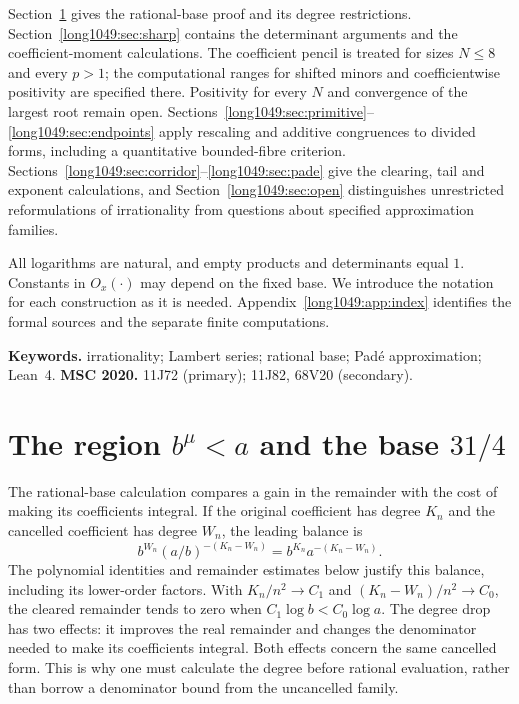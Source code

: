 \documentclass[11pt]{article}
\begin{document}
Section~\ref{long1049:sec:region} gives the rational-base proof and
its degree restrictions. Section~\ref{long1049:sec:sharp} contains
the determinant arguments and the coefficient-moment calculations.
The coefficient pencil is treated for sizes $N\le8$ and every
$p>1$; the computational ranges for shifted minors and coefficientwise
positivity are specified there. Positivity for every $N$ and
convergence of the largest root remain open.
Sections~\ref{long1049:sec:primitive}--\ref{long1049:sec:endpoints}
apply rescaling and additive congruences to divided forms, including
a quantitative bounded-fibre criterion.
Sections~\ref{long1049:sec:corridor}--\ref{long1049:sec:pade} give
the clearing, tail and exponent calculations, and
Section~\ref{long1049:sec:open} distinguishes unrestricted
reformulations of irrationality from questions about specified
approximation families.

All logarithms are natural, and empty products and determinants
equal $1$. Constants in $O_x(\cdot)$ may depend on the fixed base.
We introduce the notation for each construction as it is needed.
Appendix~\ref{long1049:app:index} identifies the formal sources and
the separate finite computations.

\medskip
\noindent\textbf{Keywords.} irrationality; Lambert series; rational base;
Pad\'e approximation; Lean~4.
\qquad
\textbf{MSC 2020.} 11J72 (primary); 11J82, 68V20 (secondary).

\section{The region \texorpdfstring{$b^{\mu}<a$}{b\textasciicircum mu < a} and the base \texorpdfstring{$31/4$}{31/4}}\label{long1049:sec:region}

The rational-base calculation compares a gain in the remainder
with the cost of making its coefficients integral. If the original
coefficient has degree $K_n$ and the cancelled coefficient has
degree $W_n$, the leading balance is
\begin{equation}\label{long1049:eq:degree-balance}
 b^{W_n}(a/b)^{-(K_n-W_n)}
 =b^{K_n}a^{-(K_n-W_n)}.
\end{equation}
The polynomial identities and remainder estimates below justify
this balance, including its lower-order factors. With
$K_n/n^2\to C_1$ and $(K_n-W_n)/n^2\to C_0$, the cleared
remainder tends to zero when $C_1\log b<C_0\log a$.
The degree drop has two effects: it improves the real remainder
and changes the denominator needed to make its coefficients integral.
Both effects concern the same cancelled form. This is why one must
calculate the degree before rational evaluation, rather than borrow
a denominator bound from the uncancelled family.
\end{document}
